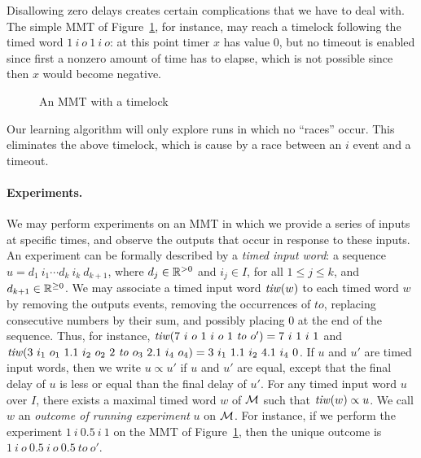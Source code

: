 Disallowing zero delays creates certain complications that we have to deal with. The simple MMT of Figure~\ref{fig:timelock}, for instance,
may reach a timelock following the timed word $1 ~ i ~ o ~ 1 ~ i ~ o$: at this point timer $x$ has value $0$, but no timeout is enabled since first a nonzero amount of time has to elapse, which is not possible since then $x$ would become negative.
\begin{figure}[ht]
\begin{center}
\caption{An MMT with a timelock}
\label{fig:timelock}
\end{center}
\end{figure}
Our learning algorithm will only explore runs in which no ``races'' occur. This eliminates the above timelock,
which is cause by a race between an $i$ event and a timeout.
\fi

\paragraph{Experiments.}
We may perform experiments on an MMT in which we
provide a series of inputs at specific times, and observe the outputs that occur in response to these inputs.
An experiment can be formally described by a \emph{timed input word}: a sequence
$u = d_1 ~ i_1 \cdots d_k ~ i_k ~ d_{k+1}$, where $d_j \in {\mathbb R}^{> 0}$ and $i_j \in I$, for all $1 \leq j \leq k$,
and $d_{k+1} \in {\mathbb R}^{\geq 0}$.
%
We may associate a timed input word $\mathit{tiw}(w)$ to each timed word $w$ by 
removing the outputs events, 
removing the occurrences of $\mathit{to}$, 
replacing consecutive numbers by their sum, 
and possibly placing $0$ at the end of the sequence.
Thus, for instance,
$\mathit{tiw} (7 ~ i ~ o ~ 1 ~ i ~ o ~ 1 ~ \mathit{to} ~ o') = 7 ~ i ~ 1 ~ i ~ 1$ and
$\mathit{tiw} (3 ~ i_1 ~ o_1 ~ 1.1 ~ i_2 ~ o_2 ~ 2 ~ \mathit{to} ~ o_3 ~ 2.1 ~ i_4 ~ o_4) = 3 ~ i_1 ~ 1.1 ~ i_2 ~ 4.1 ~ i_4 ~ 0$.
%
If $u$ and $u'$ are timed input words, then we write $u \propto u'$ if $u$ and $u'$ are equal, except that the final delay of $u$ is less or equal than the final delay of $u'$.
For any timed input word $u$ over $I$,  there exists a maximal timed word $w$ of ${\mathcal M}$ such that $\mathit{tiw}(w) \propto u$.
We call $w$ an \emph{outcome of running experiment} $u$ on ${\mathcal M}$.
For instance, if we perform the experiment $1 ~ i ~ 0.5 ~ i ~ 1$ on the MMT of Figure~\ref{fig:timelock},
then the unique outcome is $1 ~ i ~ o ~ 0.5 ~ i ~ o ~ 0.5 ~ \mathit{to} ~ o'$.

